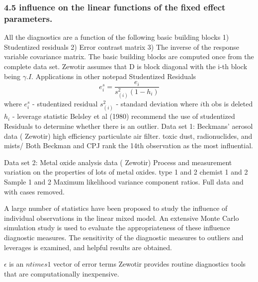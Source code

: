 \documentclass[12pt, a4paper]{article}
\begin{document}
\subsubsection*{4.5 influence on the linear functions of the fixed effect parameters.}
All the diagnostics are a function of the following basic building blocks
1)  	Studentized residuals
2)  	Error contrast matrix
3)  	The inverse of the response variable covariance matrix.
The basic building blocks are computed once from the complete data set.
Zewotir assumes that D is block diagonal with the i-th block being $\gamma. I$.
Applications in other notepad
Studentized Residuals
\[ e^s_i = \frac{e_i}{s^2_{(i)}(1-h_i)} \]
where
$e^s_i $ - studentized residual
$s^2_{(i)}$ - standard deviation where $i$th obs is deleted
$h_i$ - leverage statistic
Belsley et al (1980) recommend the use of studentized Residuals to determine whether there is an outlier.
Data set 1: Beckmans' aerosol data ( Zewotir)
high efficiency particulate air filter.
toxic dust, radionuclides, and mists/
Both Beckman and CPJ rank the 14th observation as the most influential.

\bigskip 
Data set 2: Metal oxide analysis data ( Zewotir)
Process and measurement variation on the properties of lots of metal oxides.
type 1 and 2
chemist 1 and 2
Sample 1 and 2
Maximum likelihood variance component ratios.
Full data and with cases removed.
\begin{framed}
	
A large number of statistics have been proposed to study the influence of individual 
observations in the linear mixed model. An extensive Monte Carlo simulation study is used 
to evaluate the appropriateness of these influence diagnostic measures. The sensitivity of 
the diagnostic measures to outliers and leverages is examined, and helpful results are 
obtained.
\citep{zewotir2006}
\end{framed}	

\newpage




$\epsilon$ is an $n times 1$ vector of error terms
Zewotir provides routine diagnostics tools that are computationally inexpensive.
\end{document}
